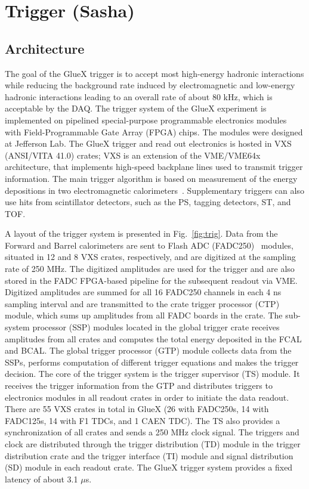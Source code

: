 
\section{Trigger (Sasha) \label{sec:trig}}
\subsection{Architecture \label{sec:trigarchitecture}}
The goal of the GlueX trigger is to accept most high-energy hadronic interactions while reducing the background rate induced by electromagnetic and low-energy hadronic interactions leading to an overall rate of about 80 kHz, which is acceptable by the DAQ.  The trigger system of the GlueX experiment\cite{GlueX:2013twa} is implemented on pipelined special-purpose programmable electronics modules with Field-Programmable Gate Array (FPGA) chips. The modules were designed at Jefferson Lab.  The GlueX trigger and read out electronics is hosted in VXS (ANSI/VITA 41.0) crates; VXS is an extension of the VME/VME64x architecture, that implements high-speed backplane lines used to transmit trigger information. The main trigger algorithm is 
based on measurement of the energy depositions in two electromagnetic calorimeters~\cite{somov_l1}. Supplementary triggers can also
use hits from scintillator detectors, such as the PS, tagging detectors, ST, and TOF.

A layout of the trigger system is presented in Fig.~\ref{fig:trig}. Data from the Forward and Barrel calorimeters are sent to  Flash ADC (FADC250)~\cite{Dong:2007} modules, situated in 12 and 8 VXS crates, respectively, and are digitized at the sampling rate of 250 MHz. The digitized amplitudes are used for the trigger and are also stored in the FADC FPGA-based pipeline for the subsequent readout via VME.
Digitized amplitudes are summed for all 16 FADC250 channels in each 4 ns sampling interval and are transmitted to the crate trigger processor (CTP) module, which sums up amplitudes from all FADC boards in the crate. The sub-system processor (SSP) modules located in the global trigger crate receives amplitudes from all crates and computes the total energy deposited in the FCAL and BCAL. The global trigger processor (GTP) module collects data from the SSPs, performs computation of different trigger equations and makes the trigger decision. The core of the trigger system is the trigger supervisor (TS) module. It receives the trigger information from the GTP and distributes triggers to electronics modules in all readout 
crates in order to initiate the data readout. There are 55 VXS crates in total in GlueX (26 with FADC250s, 14 with  FADC125s, 14 with F1 TDCs, and 1 CAEN TDC). The TS also provides a synchronization of all crates and sends a 250 MHz clock signal. The triggers and clock are distributed through the trigger distribution (TD) module in the trigger distribution crate and the trigger interface (TI) module and signal distribution (SD) module in each readout crate. The GlueX trigger system provides a fixed latency of about 3.1 $\mu$s.

